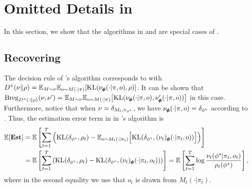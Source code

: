 \newpage
\section{Omitted Details in } \label{app: recovering}
In this section, we show that the algorithms in \cite{xu2023bayesian} and \cite{liu2025decision} are special cases of . 

\subsection{Recovering } The decision rule of \cite{liu2025decision}'s algorithm corresponds to  with $D^\pi(\nu\|\rho) = \mathbb{E}_{M\sim \nu}\mathbb{E}_{o\sim M(\cdot|\pi)}[\text{KL}(\nu_{\pmb{\phi}}(\cdot|\pi,o), \rho)]$. It can be shown that $\textup{Breg}_{D^\pi(\cdot\|\rho)}(\nu, \nu')=\mathbb{E}_{M \sim \nu}\mathbb{E}_{o \sim M(\cdot|\pi)}\big[\text{KL}(\nu_{\pmb{\phi}}(\cdot|\pi, o), \nu'_{\pmb{\phi}}(\cdot|\pi, o))\big]$ in this case. Furthermore, notice that when $\nu=\delta_{M_t, \pi_{\phi^\star}}$, we have $\nu_{\pmb{\phi}}(\cdot|\pi, o)=\delta_{\phi^\star}$ according to . Thus, the estimation error term in  in \cite{liu2025decision}'s algorithm is 
\begin{align*}
    \mathbb{E}[\textbf{\textup{Est}}] &= \mathbb{E}\left[\sum_{t=1}^T \left( \text{KL}(\delta_{\phi^\star}, \rho_t) - \mathbb{E}_{o\sim M_t(\cdot|\pi_t)} \Big[\text{KL}(\delta_{\phi^\star},  (\nu_t)_{\pmb{\phi}}(\cdot|\pi_t,o))\Big]\right) \right] \\
    &= \mathbb{E}\left[\sum_{t=1}^T \left( \text{KL}(\delta_{\phi^\star}, \rho_t) - \text{KL}(\delta_{\phi^\star},  (\nu_t)_{\pmb{\phi}}(\cdot|\pi_t,o_t))\right) \right] = \mathbb{E}\left[ \sum_{t=1}^T \log\frac{\nu_t(\phi^\star|\pi_t,o_t)}{\rho_t(\phi^\star)} \right],   
\end{align*}
where in the second equality we use that $o_t$ is drawn from $M_t(\cdot|\pi_t)$. 
